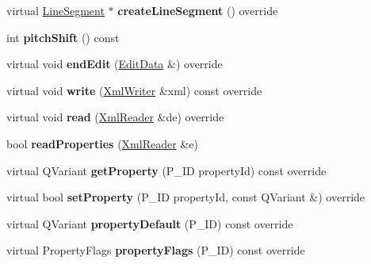\begin{DoxyCompactItemize}
virtual \hyperlink{class_ms_1_1_line_segment}{Line\+Segment} $\ast$ {\bfseries create\+Line\+Segment} () override
\item 
\mbox{\label{class_ms_1_1_ottava_ae810085d11b2cd1dcf266e31897c799d}} 
int {\bfseries pitch\+Shift} () const
\item 
\mbox{\label{class_ms_1_1_ottava_a15c6d2d7b8f75adb57f9f4b3dfb1fc14}} 
virtual void {\bfseries end\+Edit} (\hyperlink{class_ms_1_1_edit_data}{Edit\+Data} \&) override
\item 
\mbox{\label{class_ms_1_1_ottava_a977e44915c716bb5e7f77090271eaa92}} 
virtual void {\bfseries write} (\hyperlink{class_ms_1_1_xml_writer}{Xml\+Writer} \&xml) const override
\item 
\mbox{\label{class_ms_1_1_ottava_a9fd0ed41e95d8799eec21a38ac864186}} 
virtual void {\bfseries read} (\hyperlink{class_ms_1_1_xml_reader}{Xml\+Reader} \&de) override
\item 
\mbox{\label{class_ms_1_1_ottava_ad3ef6fa7360c89e7c6fbcb6cbcc6aba1}} 
bool {\bfseries read\+Properties} (\hyperlink{class_ms_1_1_xml_reader}{Xml\+Reader} \&e)
\item 
\mbox{\label{class_ms_1_1_ottava_aab7fdcaee5361da52a11132bbb6bec83}} 
virtual Q\+Variant {\bfseries get\+Property} (P\+\_\+\+ID property\+Id) const override
\item 
\mbox{\label{class_ms_1_1_ottava_a4b37b4449dc24b877149f30886ae2fc1}} 
virtual bool {\bfseries set\+Property} (P\+\_\+\+ID property\+Id, const Q\+Variant \&) override
\item 
\mbox{\label{class_ms_1_1_ottava_ae26c249729363a1b17bfaeb4891d893f}} 
virtual Q\+Variant {\bfseries property\+Default} (P\+\_\+\+ID) const override
\item 
\mbox{\label{class_ms_1_1_ottava_aad2a7a3d7d57db86047e3ce86af9e9fa}} 
virtual Property\+Flags {\bfseries property\+Flags} (P\+\_\+\+ID) const override
\item 
\mbox{\label{class_ms_1_1_ottava_a6a2e05de79d24d9a524227ea8de970c9}} 

\end{DoxyCompactItemize}
